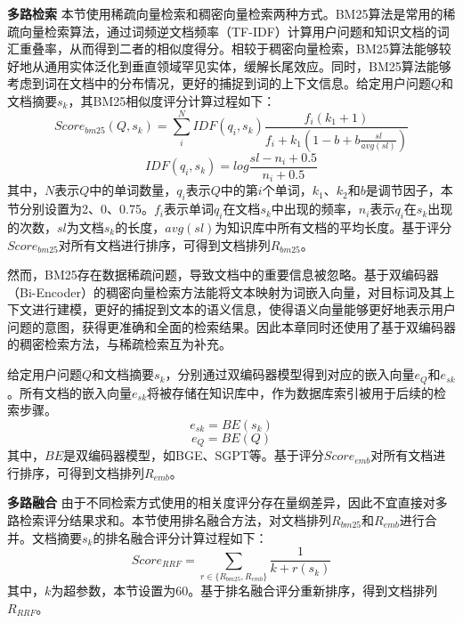 \textbf{多路检索} 本节使用稀疏向量检索和稠密向量检索两种方式。BM25算法是常用的稀疏向量检索算法，通过词频逆文档频率（TF-IDF）计算用户问题和知识文档的词汇重叠率，从而得到二者的相似度得分。相较于稠密向量检索，BM25算法能够较好地从通用实体泛化到垂直领域罕见实体，缓解长尾效应。同时，BM25算法能够考虑到词在文档中的分布情况，更好的捕捉到词的上下文信息。给定用户问题$Q$和文档摘要$s_k$，其BM25相似度评分计算过程如下：
\begin{equation}
	Score_{bm25}(Q, s_k) = \sum_{i}^{N}IDF(q_i, s_k)\frac{f_i(k_1+1)}{f_i + k_1(1 - b + b\frac{sl}{avg(sl)})}
\end{equation}
\begin{equation}
	IDF(q_i, s_k) = log\frac{sl-n_i+0.5}{n_i+0.5}
\end{equation}
其中，$N$表示$Q$中的单词数量，$q_i$表示$Q$中的第$i$个单词，$k_1$、$k_2$和$b$是调节因子，本节分别设置为2、0、0.75。$f_i$表示单词$q_i$在文档$s_k$中出现的频率，$n_i$表示$q_i$在$s_k$出现的次数，$sl$为文档$s_k$的长度，$avg(sl)$为知识库中所有文档的平均长度。基于评分$Score_{bm25}$对所有文档进行排序，可得到文档排列$R_{bm25}$。

然而，BM25存在数据稀疏问题，导致文档中的重要信息被忽略。基于双编码器（Bi-Encoder）的稠密向量检索方法能将文本映射为词嵌入向量，对目标词及其上下文进行建模，更好的捕捉到文本的语义信息，使得语义向量能够更好地表示用户问题的意图，获得更准确和全面的检索结果。因此本章同时还使用了基于双编码器的稠密检索方法，与稀疏检索互为补充。

给定用户问题$Q$和文档摘要$s_k$，分别通过双编码器模型得到对应的嵌入向量$e_Q$和$e_{sk}$。所有文档的嵌入向量$e_{sk}$将被存储在知识库中，作为数据库索引被用于后续的检索步骤。
\begin{equation}
	e_{sk} = BE(s_k)
\end{equation}
\begin{equation}
	e_Q = BE(Q)
\end{equation}
其中，$BE$是双编码器模型，如BGE\cite{DBLP:journals/corr/abs-2309-07597}、SGPT\cite{DBLP:journals/corr/abs-2202-08904}等。基于评分$Score_{emb}$对所有文档进行排序，可得到文档排列$R_{emb}$。

\textbf{多路融合} 由于不同检索方式使用的相关度评分存在量纲差异，因此不宜直接对多路检索评分结果求和。本节使用排名融合方法，对文档排列$R_{bm25}$和$R_{emb}$进行合并。文档摘要$s_k$的排名融合评分计算过程如下：
\begin{equation}
	Score_{RRF} = \sum_{r \in \{R_{bm25},R_{emb}\}}\frac{1}{k + r(s_k)}
\end{equation}
其中，$k$为超参数，本节设置为60。基于排名融合评分重新排序，得到文档排列$R_{RRF}$。

